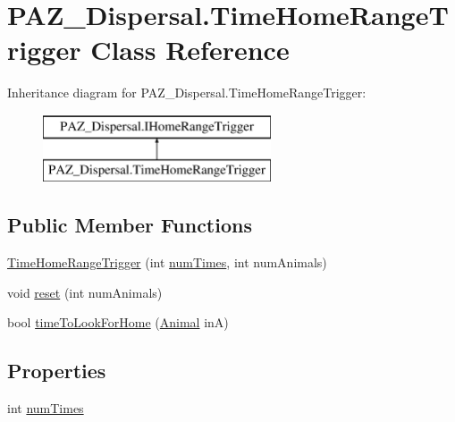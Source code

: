\hypertarget{class_p_a_z___dispersal_1_1_time_home_range_trigger}{\section{P\-A\-Z\-\_\-\-Dispersal.\-Time\-Home\-Range\-Trigger Class Reference}
\label{class_p_a_z___dispersal_1_1_time_home_range_trigger}
}
Inheritance diagram for P\-A\-Z\-\_\-\-Dispersal.\-Time\-Home\-Range\-Trigger\-:\begin{figure}[H]
\begin{center}
\leavevmode
\includegraphics[height=2.000000cm]{class_p_a_z___dispersal_1_1_time_home_range_trigger}
\end{center}
\end{figure}
\subsection*{Public Member Functions}
\begin{DoxyCompactItemize}
\item 
\hyperlink{class_p_a_z___dispersal_1_1_time_home_range_trigger_a5bdbd43eee2db22bf0304f1988728670}{Time\-Home\-Range\-Trigger} (int \hyperlink{class_p_a_z___dispersal_1_1_time_home_range_trigger_af3cc954938a9a47f0272b6be57132fc8}{num\-Times}, int num\-Animals)
\item 
void \hyperlink{class_p_a_z___dispersal_1_1_time_home_range_trigger_a5fc3bb5c45ff414c75346f2d05dfe84a}{reset} (int num\-Animals)
\item 
bool \hyperlink{class_p_a_z___dispersal_1_1_time_home_range_trigger_a13dbb8900899d4e24de0679169946b35}{time\-To\-Look\-For\-Home} (\hyperlink{class_p_a_z___dispersal_1_1_animal}{Animal} in\-A)
\end{DoxyCompactItemize}
\subsection*{Properties}
\begin{DoxyCompactItemize}
\item 
int \hyperlink{class_p_a_z___dispersal_1_1_time_home_range_trigger_af3cc954938a9a47f0272b6be57132fc8}{num\-Times}
\end{DoxyCompactItemize}


